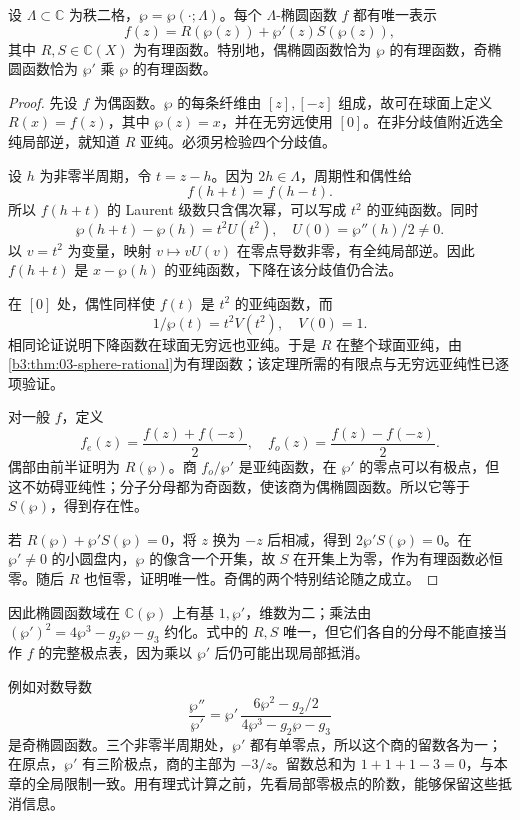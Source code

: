 \begin{theorem}[椭圆函数域]\label{b3:thm:22-function-field}
设 \(\Lambda\subset\mathbb C\) 为秩二格，\(\wp=\wp(\cdot;\Lambda)\)。每个 \(\Lambda\)-椭圆函数 \(f\) 都有唯一表示
\[
 f(z)=R(\wp(z))+\wp'(z)S(\wp(z)),
\]
其中 \(R,S\in\mathbb C(X)\) 为有理函数。特别地，偶椭圆函数恰为 \(\wp\) 的有理函数，奇椭圆函数恰为 \(\wp'\) 乘 \(\wp\) 的有理函数。
\end{theorem}
\begin{proof}
先设 \(f\) 为偶函数。\(\wp\) 的每条纤维由 \([z],[-z]\) 组成，故可在球面上定义 \(R(x)=f(z)\)，其中 \(\wp(z)=x\)，并在无穷远使用 \([0]\)。在非分歧值附近选全纯局部逆，就知道 \(R\) 亚纯。必须另检验四个分歧值。

设 \(h\) 为非零半周期，令 \(t=z-h\)。因为 \(2h\in\Lambda\)，周期性和偶性给
\[
 f(h+t)=f(h-t).
\]
所以 \(f(h+t)\) 的 Laurent 级数只含偶次幂，可以写成 \(t^2\) 的亚纯函数。同时
\[
 \wp(h+t)-\wp(h)=t^2 U(t^2),\quad U(0)=\wp''(h)/2\ne0.
\]
以 \(v=t^2\) 为变量，映射 \(v\mapsto vU(v)\) 在零点导数非零，有全纯局部逆。因此 \(f(h+t)\) 是 \(x-\wp(h)\) 的亚纯函数，下降在该分歧值仍合法。

在 \([0]\) 处，偶性同样使 \(f(t)\) 是 \(t^2\) 的亚纯函数，而
\[
 1/\wp(t)=t^2V(t^2),\quad V(0)=1.
\]
相同论证说明下降函数在球面无穷远也亚纯。于是 \(R\) 在整个球面亚纯，由\cref{b3:thm:03-sphere-rational}为有理函数；该定理所需的有限点与无穷远亚纯性已逐项验证。

对一般 \(f\)，定义
\[
 f_e(z)=\frac{f(z)+f(-z)}2,\quad
 f_o(z)=\frac{f(z)-f(-z)}2.
\]
偶部由前半证明为 \(R(\wp)\)。商 \(f_o/\wp'\) 是亚纯函数，在 \(\wp'\) 的零点可以有极点，但这不妨碍亚纯性；分子分母都为奇函数，使该商为偶椭圆函数。所以它等于 \(S(\wp)\)，得到存在性。

若 \(R(\wp)+\wp'S(\wp)=0\)，将 \(z\) 换为 \(-z\) 后相减，得到 \(2\wp'S(\wp)=0\)。在 \(\wp'\ne0\) 的小圆盘内，\(\wp\) 的像含一个开集，故 \(S\) 在开集上为零，作为有理函数必恒零。随后 \(R\) 也恒零，证明唯一性。奇偶的两个特别结论随之成立。
\end{proof}
因此椭圆函数域在 \(\mathbb C(\wp)\) 上有基 \(1,\wp'\)，维数为二；乘法由 \((\wp')^2=4\wp^3-g_2\wp-g_3\) 约化。式中的 \(R,S\) 唯一，但它们各自的分母不能直接当作 \(f\) 的完整极点表，因为乘以 \(\wp'\) 后仍可能出现局部抵消。

\ProseParagraphBreak

例如对数导数
\[
 \frac{\wp''}{\wp'}
 =\wp'\,\frac{6\wp^2-g_2/2}{4\wp^3-g_2\wp-g_3}
\]
是奇椭圆函数。三个非零半周期处，\(\wp'\) 都有单零点，所以这个商的留数各为一；在原点，\(\wp'\) 有三阶极点，商的主部为 \(-3/z\)。留数总和为 \(1+1+1-3=0\)，与本章的全局限制一致。用有理式计算之前，先看局部零极点的阶数，能够保留这些抵消信息。

